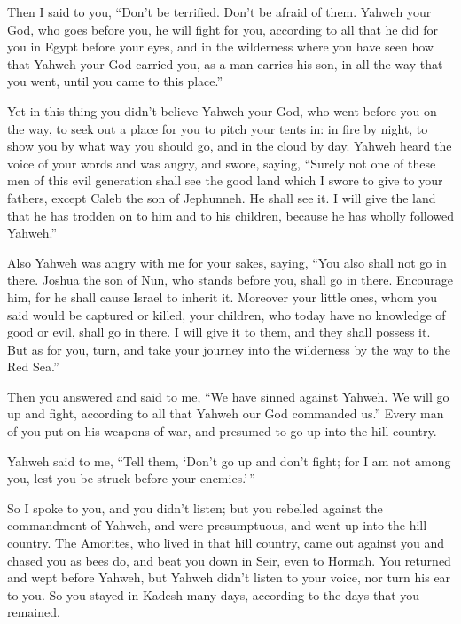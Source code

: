  Then I said to you, ``Don't be terrified. Don't be
afraid of them.  Yahweh your God, who goes before you, he
will fight for you, according to all that he did for you in Egypt before
your eyes,  and in the wilderness where you have seen how
that Yahweh your God carried you, as a man carries his son, in all the
way that you went, until you came to this place.''

 Yet in this thing you didn't believe Yahweh your God,
 who went before you on the way, to seek out a place for
you to pitch your tents in: in fire by night, to show you by what way
you should go, and in the cloud by day.  Yahweh heard the
voice of your words and was angry, and swore, saying, 
``Surely not one of these men of this evil generation shall see the good
land which I swore to give to your fathers,  except Caleb
the son of Jephunneh. He shall see it. I will give the land that he has
trodden on to him and to his children, because he has wholly followed
Yahweh.''

 Also Yahweh was angry with me for your sakes, saying,
``You also shall not go in there.  Joshua the son of Nun,
who stands before you, shall go in there. Encourage him, for he shall
cause Israel to inherit it.  Moreover your little ones,
whom you said would be captured or killed, your children, who today have
no knowledge of good or evil, shall go in there. I will give it to them,
and they shall possess it.  But as for you, turn, and
take your journey into the wilderness by the way to the Red Sea.''

 Then you answered and said to me, ``We have sinned
against Yahweh. We will go up and fight, according to all that Yahweh
our God commanded us.'' Every man of you put on his weapons of war, and
presumed to go up into the hill country.

 Yahweh said to me, ``Tell them, `Don't go up and don't
fight; for I am not among you, lest you be struck before your
enemies.'\,''

 So I spoke to you, and you didn't listen; but you
rebelled against the commandment of Yahweh, and were presumptuous, and
went up into the hill country.  The Amorites, who lived
in that hill country, came out against you and chased you as bees do,
and beat you down in Seir, even to Hormah.  You returned
and wept before Yahweh, but Yahweh didn't listen to your voice, nor turn
his ear to you.  So you stayed in Kadesh many days,
according to the days that you remained.

